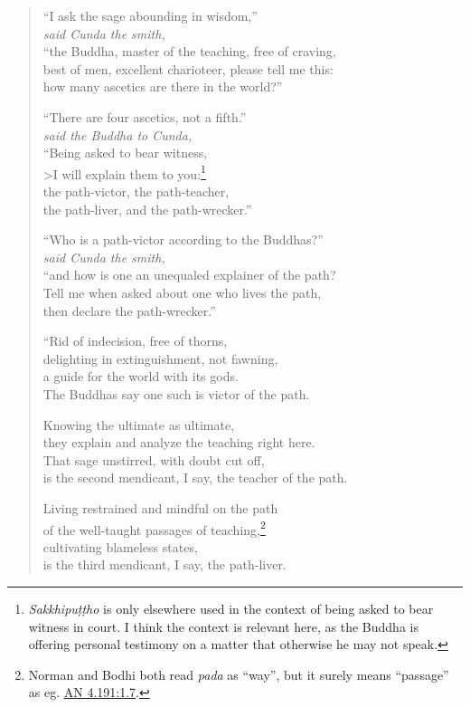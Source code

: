 \documentclass[12pt,openany]{book}%
\newcommand*{\scspeaker}[1]{\hspace{2em}\textit{#1}}
\begin{document}
\begin{verse}%
“I ask the sage abounding in wisdom,” \\
\scspeaker{said Cunda the smith, }\\
“the Buddha, master of the teaching, free of craving, \\
best of men, excellent charioteer, please tell me this: \\
how many ascetics are there in the world?” 

“There are four ascetics, not a fifth.” \\
\scspeaker{said the Buddha to Cunda, }\\
“Being asked to bear witness, \\>I will explain them to you:\footnote{\textit{\textsanskrit{Sakkhipuṭṭho}} is only elsewhere used in the context of being asked to bear witness in court. I think the context is relevant here, as the Buddha is offering personal testimony on a matter that otherwise he may not speak. } \\
the path-victor, the path-teacher, \\
the path-liver, and the path-wrecker.” 

“Who is a path-victor according to the Buddhas?” \\
\scspeaker{said Cunda the smith, }\\
“and how is one an unequaled explainer of the path? \\
Tell me when asked about one who lives the path, \\
then declare the path-wrecker.” 

“Rid of indecision, free of thorns, \\
delighting in extinguishment, not fawning, \\
a guide for the world with its gods. \\
The Buddhas say one such is victor of the path. 

Knowing the ultimate as ultimate, \\
they explain and analyze the teaching right here. \\
That sage unstirred, with doubt cut off, \\
is the second mendicant, I say, the teacher of the path. 

Living restrained and mindful on the path \\
of the well-taught passages of teaching,\footnote{Norman and Bodhi both read \textit{pada} as “way”, but it surely means “passage” as eg. \href{https://suttacentral.net/an4.191/en/sujato\#1.7}{AN 4.191:1.7}. } \\
cultivating blameless states, \\
is the third mendicant, I say, the path-liver. 


\end{verse}
\end{document}
